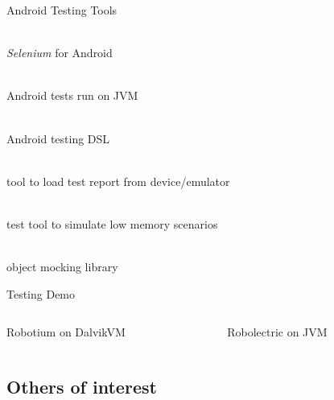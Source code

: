 \documentclass[aspectratio=169]{beamer}
\newcommand{\surl}[1] {{\tiny \url{#1}}}
\begin{document}
    \begin{frame}{Android Testing Tools}
      \begin{description}
        \item<1->[Robotium \surl{http://robotium.org}] \hfill \\ \emph{Selenium} for Android
        \item<2->[Robolectric \surl{http://robolectric.org}] \hfill \\ Android tests run on JVM
        \item<3->[Calculon \surl{https://github.com/kaeppler/calculon}] \hfill \\ Android testing DSL
        \item<4->[Android JUnit Report \surl{https://github.com/jsankey/android-junit-report}] \hfill \\ tool to load test report from device/emulator
        \item<5->[Memory Sucker \surl{https://github.com/nollbit/memory-sucker}] \hfill \\ test tool to simulate low memory scenarios 
        \item<6->[Android Mock \surl{http://code.google.com/p/android-mock/}] \hfill \\ object mocking library
      \end{description}
    \end{frame}

    \begin{frame}{Testing Demo}
      \begin{columns}[t]
        \begin{column}[c]{0.5\textwidth}
          Robotium on DalvikVM
        \end{column}
        \begin{column}[c]{0.5\textwidth}
          Robolectric on JVM
        \end{column}
      \end{columns}
    \end{frame}

  \subsection{Others of interest}  
\end{document}
